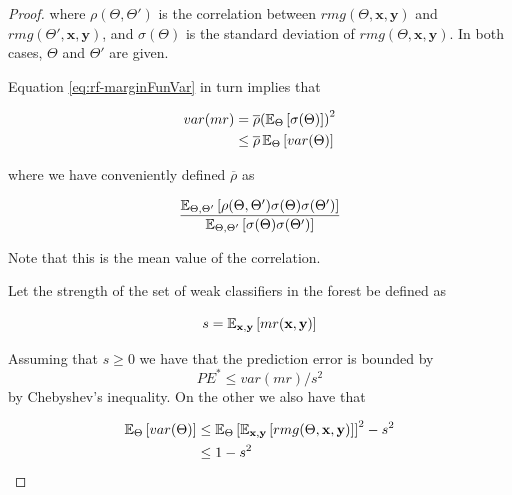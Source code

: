 \begin{proof}
	where $ \rho(\Theta, \Theta')$ is the correlation between $rmg(\Theta,\textbf{x},\textbf{y})$ and $rmg(\Theta',\textbf{x},\textbf{y})$, and $\sigma(\Theta)$ is the standard deviation of $rmg(\Theta,\textbf{x},\textbf{y})$.
    In both cases, $\Theta$ and $\Theta'$ are given.%

	Equation \cref{eq:rf-marginFunVar} in turn implies that

	\begin{equation}\label{eq:rf-varianceBound}
            \begin{split}
            var(mr) & = \overline{\rho} {(\operatorname{\mathbb{E}}_{\Theta}\left[ \sigma(\Theta)\right] )}^2 \\
            & \leq \overline{\rho} \operatorname{\mathbb{E}}_{\Theta} \left[ var(\Theta) \right]
            \end{split}
            \end{equation}

	where we have conveniently defined $\overline{\rho}$ as

	\begin{equation}\label{eq:rf-meanCorrelation}
            \frac{\operatorname{\mathbb{E}}_{\Theta, \Theta'} \left[ \rho(\Theta, \Theta') \sigma(\Theta) \sigma(\Theta')\right]}
            {\operatorname{\mathbb{E}}_{\Theta, \Theta'} \left[ \sigma(\Theta) \sigma(\Theta')\right]}
            \end{equation}

	Note that this is the mean value of the correlation.

	Let the strength of the set of weak classifiers in the forest be defined as

            \begin{equation}\label{eq:rf-strength}
            s = \operatorname{\mathbb{E}}_{\textbf{x},\textbf{y}} \left[ mr(\textbf{x},\textbf{y} ) \right]
            \end{equation}

	Assuming that $s \geq 0$ we have that the prediction error is bounded by
            \begin{equation}\label{eq:rf-predictiveErrorBound1}
            PE^* \leq var(mr)/s^2
            \end{equation}
	by Chebyshev's inequality. On the other we also have that

            \begin{equation}\label{eq:rf-expectedVarBound}
            \begin{split}
            \operatorname{\mathbb{E}}_{\Theta} \left[ var(\Theta) \right] & \leq \operatorname{\mathbb{E}}_{\Theta} {\left[ \operatorname{\mathbb{E}}_{\textbf{x},\textbf{y}}\left[ rmg(\Theta,\textbf{x},\textbf{y})  \right] \right]}^2 -s^2 \\
            & \leq 1-s^2
            \end{split}
            \end{equation}




\end{proof}
